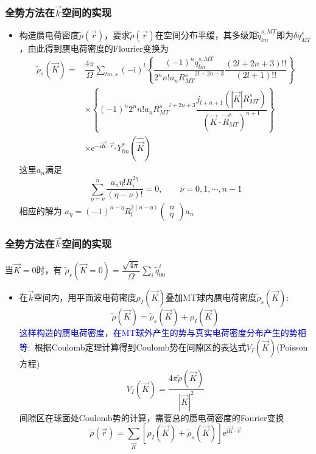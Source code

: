 {\frame
{
	\frametitle{全势方法在$\vec k$空间的实现}
\begin{itemize}
	\item 构造赝电荷密度$\tilde\rho(\vec r)$，要求$\tilde\rho(\vec r)$在空间分布平缓，其多级矩$\tilde q_{lm}^{s,MT}$即为$\delta q_{MT}^s$，由此得到赝电荷密度的\textrm{Flourier}变换为
	\begin{displaymath}
		\begin{aligned}
			\tilde\rho_s(\vec K)=&\dfrac{4\pi}{\Omega}\sum_{lm,s}(-\mathrm{i})^l\left\{\dfrac{(-1)^n\tilde q_{lm}^{s,MT}}{2^nn!a_n{R_{MT}^s}^{2l+2n+3}}\dfrac{(2l+2n+3)!!}{(2l+1)!!}\right\}\\
			&\times\left\{(-1)^n2^nn!a_n{R_{MT}^s}^{l+2n+3}\dfrac{j_{l+n+1}(|\vec K|R_{MT}^s)}{(\vec K\cdot\vec R_{MT}^s)^{n+1}}\right\}\\
			&\times\mathrm{e}^{\mathrm{-i}\vec K\cdot\vec r_s}Y_{lm}^{\ast}(\hat{\vec K})
		\end{aligned}
	\end{displaymath}
	这里$a_n$满足
	\begin{displaymath}
		\sum_{\eta=\nu}^n\dfrac{a_n\eta!R_i^{2\eta}}{(\eta-\nu)!}=0,\qquad \nu=0,1,\cdots,n-1
	\end{displaymath}
	相应的解为
	$a_{\eta}=(-1)^{n-\eta}R_l^{2(n-\eta)}
	\begin{pmatrix}
		n\\\eta
	\end{pmatrix}
	a_n$
\end{itemize}
}

\frame
{
	\frametitle{全势方法在$\vec k$空间的实现}
	当$\vec K=0$时，有
		$\tilde\rho_s(\vec K=0)=\dfrac{\sqrt{4\pi}}{\Omega}\sum\limits_i\tilde{q}_{00}^i$
\begin{itemize}
	\item 在$\vec k$空间内，用平面波电荷密度$\rho_I(\vec K)$叠加\textrm{MT}球内赝电荷密度$\tilde\rho_s(\vec K)$:
		\begin{displaymath}
			\tilde\rho(\vec K)=\tilde\rho_s(\vec K)+\rho_I(\vec K)
		\end{displaymath}
		\textcolor{blue}{这样构造的赝电荷密度，在\textrm{MT}球外产生的势与真实电荷密度分布产生的势相等}:~根据\textrm{Coulomb}定理计算得到\textrm{Coulomb}势在间隙区的表达式$V_I(\vec K)$(\textrm{Poisson}方程)
		\begin{displaymath}
			V_I(\vec K)=\dfrac{4\pi\tilde\rho(\vec K)}{|\vec K|^2}
		\end{displaymath}
	间隙区在球面处\textrm{Coulomb}势的计算，需要总的赝电荷密度的\textrm{Fourier}变换
	\begin{displaymath}
		\tilde\rho(\vec r)=\sum_{\vec K}[\rho_I(\vec K)+\tilde\rho_s(\vec K)]\mathrm{e}^{\mathrm{i}\vec K\cdot\vec r}
	\end{displaymath}
\end{itemize}
}

}

